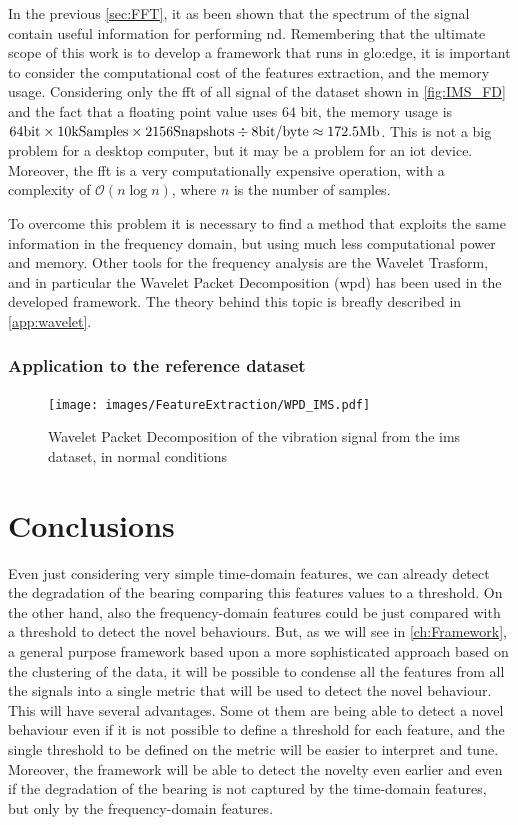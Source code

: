 In the previous \autoref{sec:FFT}, it as been shown that the spectrum of the signal contain useful information for performing \gls{nd}. Remembering that the ultimate scope of this work is to develop a framework that runs in \gls{glo:edge}, it is important to consider the computational cost of the features extraction, and the memory usage. Considering only the \gls{fft} of all signal of the dataset shown in \autoref{fig:IMS_FD} and the fact that a floating point value uses $64$ bit, the memory usage is $64 \si{\bit} \times 10 \text{kSamples} \times 2156 \text{Snapshots} \div 8 \text{bit/byte} \approx 172.5 \text{Mb}$. This is not a big problem for a desktop computer, but it may be a problem for an \gls{iot} device. Moreover, the \gls{fft} is a very computationally expensive operation, with a complexity of $\mathcal{O}(n \log n)$, where $n$ is the number of samples.

To overcome this problem it is necessary to find a method that exploits the same information in the frequency domain, but using much less computational power and memory. Other tools for the frequency analysis are the Wavelet Trasform, and in particular the Wavelet Packet Decomposition (\gls{wpd}) has been used in the developed framework. The theory behind this topic is breafly described in \autoref{app:wavelet}.

\subsubsection{Application to the reference dataset}


\begin{figure}
    \centering
    \texttt{[image: images/FeatureExtraction/WPD\_IMS.pdf]}
    \caption{Wavelet Packet Decomposition of the  vibration signal from the \gls{ims} dataset, in normal conditions}
    \label{fig:IMS_WPD}
\end{figure}

\section{Conclusions}
Even just considering very simple time-domain features, we can already detect the degradation of the bearing comparing this features values to a threshold. On the other hand, also the frequency-domain features could be just compared with a threshold to detect the novel behaviours. But, as we will see in \autoref{ch:Framework}, a general purpose framework based upon a more sophisticated approach based on the clustering of the data, it will be possible to condense all the features from all the signals into a single metric that will be used to detect the novel behaviour. This will have several advantages. Some ot them are being able to detect a novel behaviour even if it is not possible to define a threshold for each feature, and the single threshold to be defined on the metric will be easier to interpret and tune. Moreover, the framework will be able to detect the novelty even earlier and even if the degradation of the bearing is not captured by the time-domain features, but only by the frequency-domain features.

